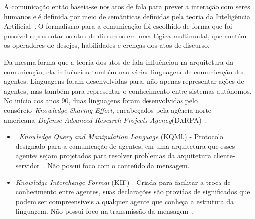A comunicação então baseia-se nos atos de fala para prever a interação com seres humanos e é definida por meio de semânticas definidas pela teoria da Inteligência Artificial~\cite{wooldridge04}. O formalismo para a comunicação foi escolhido de forma que foi possível representar os atos de discursos em uma lógica multimodal, que contém os operadores de desejos, habilidades e crenças dos atos de discurso.

Da mesma forma que a teoria dos atos de fala influênciou na arquitetura da comunicação, ela influênciou também nas várias linguagens de comunicação dos agentes. Linguagens foram desenvolvidas para, não apenas representar ações de agentes, mas também para representar o conhecimento entre sistemas autônomos. No início dos anos 90, duas linguagens foram desenvolvidas pelo consórcio~\emph{Knowledge Sharing Effort}, encabeçados pela agência norte americana~\emph{Defense Advanced Research Projects Agency}(DARPA)~\cite{kse}.
\begin{itemize}
	\item ~\emph{Knowledge Query and Manipulation Language} (KQML) - Protocolo designado para a comunicação de agentes, em uma arquitetura que esses agentes sejam projetados para resolver problemas da arquitetura cliente-servidor~\cite{preece1997}. Não possui foco com o conteúdo da mensagem.
	\item \emph{Knowledge Interchange Format} (KIF) - Criada para facilitar a troca de conhecimento entre agentes, suas declarações são providas de significados que podem ser compreensíveis a qualquer agente que conheça a estrutura da linguagem. Não possui foco na transmissão da mensagem~\cite{kifmanual}.
\end{itemize}














